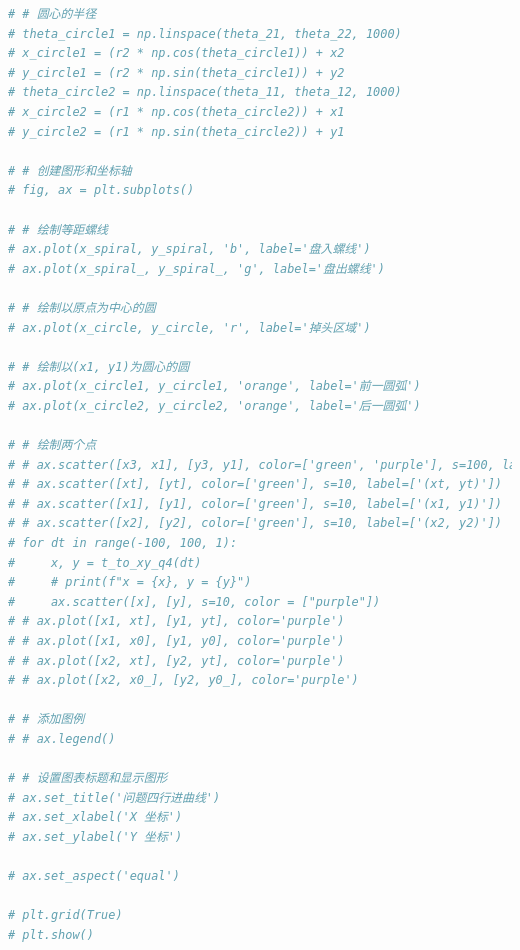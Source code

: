 \documentclass[a4paper]{article}
\begin{document}
\begin{lstlisting}[language=python,columns=fullflexible,frame=shadowbox]
# # 圆心的半径
# theta_circle1 = np.linspace(theta_21, theta_22, 1000)
# x_circle1 = (r2 * np.cos(theta_circle1)) + x2
# y_circle1 = (r2 * np.sin(theta_circle1)) + y2
# theta_circle2 = np.linspace(theta_11, theta_12, 1000)
# x_circle2 = (r1 * np.cos(theta_circle2)) + x1
# y_circle2 = (r1 * np.sin(theta_circle2)) + y1

# # 创建图形和坐标轴
# fig, ax = plt.subplots()

# # 绘制等距螺线
# ax.plot(x_spiral, y_spiral, 'b', label='盘入螺线')
# ax.plot(x_spiral_, y_spiral_, 'g', label='盘出螺线')

# # 绘制以原点为中心的圆
# ax.plot(x_circle, y_circle, 'r', label='掉头区域')

# # 绘制以(x1, y1)为圆心的圆
# ax.plot(x_circle1, y_circle1, 'orange', label='前一圆弧')
# ax.plot(x_circle2, y_circle2, 'orange', label='后一圆弧')

# # 绘制两个点
# # ax.scatter([x3, x1], [y3, y1], color=['green', 'purple'], s=100, label=['Point (x3, y3)', 'Point (x1, y1)'])
# # ax.scatter([xt], [yt], color=['green'], s=10, label=['(xt, yt)'])
# # ax.scatter([x1], [y1], color=['green'], s=10, label=['(x1, y1)'])
# # ax.scatter([x2], [y2], color=['green'], s=10, label=['(x2, y2)'])
# for dt in range(-100, 100, 1):
#     x, y = t_to_xy_q4(dt)
#     # print(f"x = {x}, y = {y}")
#     ax.scatter([x], [y], s=10, color = ["purple"])
# # ax.plot([x1, xt], [y1, yt], color='purple')
# # ax.plot([x1, x0], [y1, y0], color='purple')
# # ax.plot([x2, xt], [y2, yt], color='purple')
# # ax.plot([x2, x0_], [y2, y0_], color='purple')

# # 添加图例
# # ax.legend()

# # 设置图表标题和显示图形
# ax.set_title('问题四行进曲线')
# ax.set_xlabel('X 坐标')
# ax.set_ylabel('Y 坐标')

# ax.set_aspect('equal')

# plt.grid(True)
# plt.show()
	\end{lstlisting}
 	
	\begin{lstlisting}[language=python,columns=fullflexible,frame=shadowbox]
	\end{lstlisting}
 	
\end{document}
